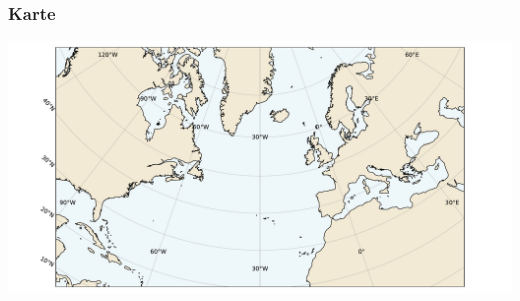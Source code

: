 

\begin{frame}
	\frametitle{Karte}
	\includegraphics[width=\textwidth]{../images/weather/map.pdf}
\end{frame}

